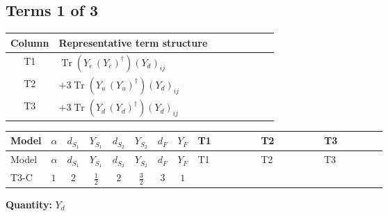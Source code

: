 \documentclass[8pt]{article}
\begin{document}
\begin{landscape}
\subsection*{Terms 1 of 3}
\begin{center}
\begin{tabular}{@{}c >{\raggedright\arraybackslash}p{0.82\linewidth}@{}}
\toprule
Column & Representative term structure \\
\midrule
T1 & \(\displaystyle \operatorname{Tr}\!\left({Y_e}\,\left({Y_e}\right)^{\dagger}\right) \left({Y_d}\right)_{ij}\) \\
\midrule
T2 & \(\displaystyle +3 \operatorname{Tr}\!\left({Y_u}\,\left({Y_u}\right)^{\dagger}\right) \left({Y_d}\right)_{ij}\) \\
\midrule
T3 & \(\displaystyle +3 \operatorname{Tr}\!\left({Y_d}\,\left({Y_d}\right)^{\dagger}\right) \left({Y_d}\right)_{ij}\) \\
\midrule
\bottomrule
\end{tabular}
\end{center}
\smallskip
\tiny
\begin{longtable}{@{}llcccccc >{\raggedright\arraybackslash}p{0.21\linewidth} >{\raggedright\arraybackslash}p{0.21\linewidth} >{\raggedright\arraybackslash}p{0.21\linewidth}@{}}
\toprule
Model & $\alpha$ & $d_{S_1}$ & $Y_{S_1}$ & $d_{S_2}$ & $Y_{S_2}$ & $d_F$ & $Y_F$ & T1 & T2 & T3 \\
\midrule
\endfirsthead
\toprule
Model & $\alpha$ & $d_{S_1}$ & $Y_{S_1}$ & $d_{S_2}$ & $Y_{S_2}$ & $d_F$ & $Y_F$ & T1 & T2 & T3 \\
\midrule
\endhead
T3-C & $1$ & $2$ & $\frac{1}{2}$ & $2$ & $\frac{3}{2}$ & $3$ & $1$ & \scriptsize\adjustbox{max width=\linewidth}{$\begin{gathered} \operatorname{Tr}\!\left({Y_e}\,\left({Y_e}\right)^{\dagger}\right) \left({Y_d}\right)_{ij}\end{gathered}$} & \scriptsize\adjustbox{max width=\linewidth}{$\begin{gathered} +3 \operatorname{Tr}\!\left({Y_u}\,\left({Y_u}\right)^{\dagger}\right) \left({Y_d}\right)_{ij}\end{gathered}$} & \scriptsize\adjustbox{max width=\linewidth}{$\begin{gathered} +3 \operatorname{Tr}\!\left({Y_d}\,\left({Y_d}\right)^{\dagger}\right) \left({Y_d}\right)_{ij}\end{gathered}$} \\
\midrule
\bottomrule
\end{longtable}
\clearpage
\noindent\textbf{Quantity: }$Y_d$\par\smallskip

\end{landscape}
\end{document}
